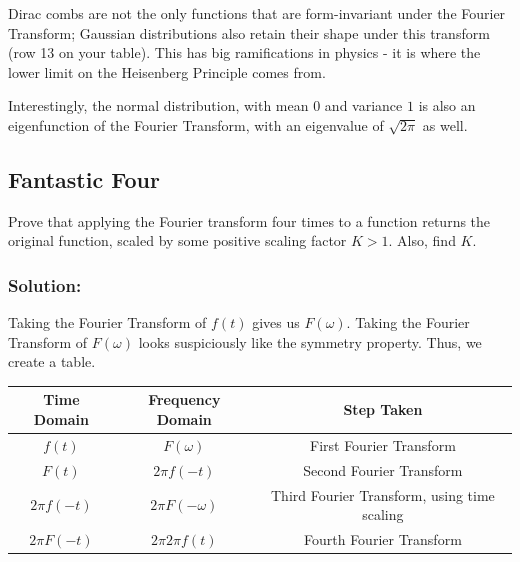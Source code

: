 \documentclass{article}
\begin{document}
Dirac combs are not the only functions that are form-invariant under the Fourier Transform; Gaussian distributions also retain their shape under this transform (row 13 on your table). This has big ramifications in physics - it is where the lower limit on the Heisenberg Principle comes from.

Interestingly, the normal distribution, with mean $0$ and variance $1$ is also an eigenfunction of the Fourier Transform, with an eigenvalue of $\sqrt{2 \pi}$ as well.

\vspace{3cm}

\subsection{Fantastic Four}
Prove that applying the Fourier transform four times to a function returns the original function, scaled by some positive scaling factor $K > 1$. Also, find $K$.

\subsubsection{Solution:}

Taking the Fourier Transform of $f(t)$ gives us $F(\omega)$. Taking the Fourier Transform of $F(\omega)$ looks suspiciously like the symmetry property. Thus, we create a table.


\begin{center}
\begin{tabular}{||c | c | c ||} 
 \hline
 Time Domain & Frequency Domain & Step Taken  \\ [1ex] 
 \hline\hline
 $f(t)$ & $F(\omega)$ & First Fourier Transform \\ [1ex] 
 \hline
 $F(t)$ & $2\pi f(-t)$ & Second Fourier Transform \\ [1ex] 
 \hline
 $2 \pi f(-t)$ & $2\pi F(-\omega)$ & Third Fourier Transform, using time scaling \\ [1ex] 
 \hline
 $2 \pi F(-t)$ & $2\pi 2 \pi f(t)$ & Fourth Fourier Transform \\ [1ex] 
 \hline
\end{tabular}
\end{center}
\end{document}
